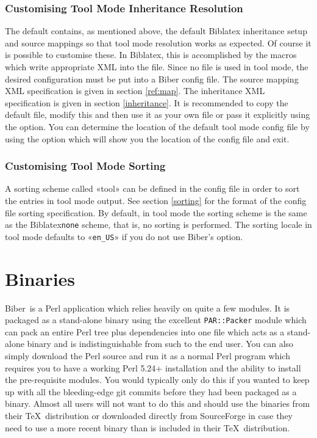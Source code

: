 \documentclass{ltxdockit}
\newcommand*{\biber}{Biber\xspace}
\newcommand*{\biblatex}{Biblatex\xspace}
\begin{document}
\subsubsection{Customising Tool Mode Inheritance Resolution}
The default  contains, as mentioned above, the
default \biblatex {} inheritance setup and \bibtex source
mappings so that tool mode resolution works as expected. Of course it is
possible to customise these. In \biblatex, this is accomplished by the
 macros which write appropriate XML into the
 file. Since no  file is used in tool mode, the
desired configuration must be put into a \biber config file. The source
mapping XML specification is given in section \ref{ref:map}. The inheritance
XML specification is given in section \ref{inheritance}. It is recommended
to copy the default  file, modify this and then use
it as your own  file or pass it explicitly using the
 option. You can determine the location of the default
tool mode config file by using the  option which will
show you the location of the config file and exit.

\subsubsection{Customising Tool Mode Sorting}
A sorting scheme called «tool» can be defined in the config file in
order to sort the entries in tool mode output. See section \ref{sorting}
for the format of the config file sorting specification. By default, in
tool mode the sorting scheme is the same as the \biblatex \texttt{none}
scheme, that is, no sorting is performed. The sorting locale in tool mode
defaults to «\texttt{en\_US}» if you do not use \biber's 
option.
\bigskip
\section{Binaries}\label{binaries}

\biber\ is a Perl application which relies heavily on quite a few
modules. It is packaged as a stand-alone binary using the excellent
\verb+PAR::Packer+ module which can pack an entire Perl tree plus
dependencies into one file which acts as a stand-alone binary and is
indistinguishable from such to the end user. You can also simply download
the Perl source and run it as a normal Perl program which
requires you to have a working Perl 5.24+ installation and the
ability to install the pre-requisite modules. You would typically only do
this if you wanted to keep up with all the bleeding-edge git commits before
they had been packaged as a binary. Almost all users will not want to do
this and should use the binaries from their \TeX\ distribution or downloaded
directly from SourceForge in case they need to use a more recent binary
than is included in their \TeX\ distribution.
\end{document}
